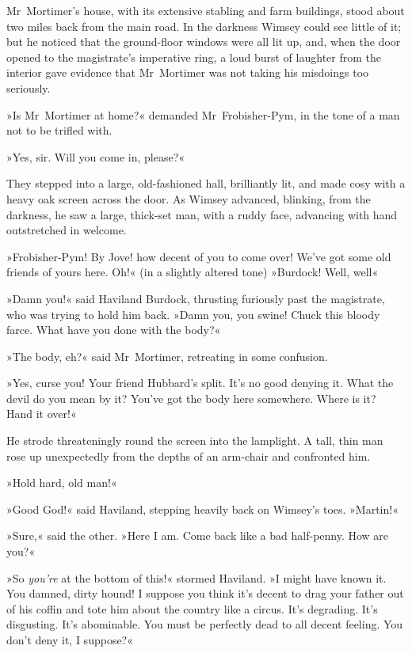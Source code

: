 Mr~Mortimer's house, with its extensive stabling and farm buildings, stood about two miles back from the main road. In the darkness Wimsey could see little of it; but he noticed that the ground-floor windows were all lit up, and, when the door opened to the magistrate's imperative ring, a loud burst of laughter from the interior gave evidence that Mr~Mortimer was not taking his misdoings too seriously.

»Is Mr~Mortimer at home?« demanded Mr~Frobisher-Pym, in the tone of a man not to be trifled with.

»Yes, sir. Will you come in, please?«

They stepped into a large, old-fashioned hall, brilliantly lit, and made cosy with a heavy oak screen across the door. As Wimsey advanced, blinking, from the darkness, he saw a large, thick-set man, with a ruddy face, advancing with hand outstretched in welcome.

»Frobisher-Pym! By Jove! how decent of you to come over! We've got some old friends of yours here. Oh!« (in a slightly altered tone) »Burdock! Well, well\longdash«

»Damn you!« said Haviland Burdock, thrusting furiously past the magistrate, who was trying to hold him back. »Damn you, you swine! Chuck this bloody farce. What have you done with the body?«

»The body, eh?« said Mr~Mortimer, retreating in some confusion.

»Yes, curse you! Your friend Hubbard's split. It's no good denying it. What the devil do you mean by it? You've got the body here somewhere. Where is it? Hand it over!«

He strode threateningly round the screen into the lamplight. A tall, thin man rose up unexpectedly from the depths of an arm-chair and confronted him.

»Hold hard, old man!«

»Good God!« said Haviland, stepping heavily back on Wimsey's toes. »Martin!«

»Sure,« said the other. »Here I am. Come back like a bad half-penny. How are you?«

»So \textit{you're} at the bottom of this!« stormed Haviland. »I might have known it. You damned, dirty hound! I suppose you think it's decent to drag your father out of his coffin and tote him about the country like a circus. It's degrading. It's disgusting. It's abominable. You must be perfectly dead to all decent feeling. You don't deny it, I suppose?«

